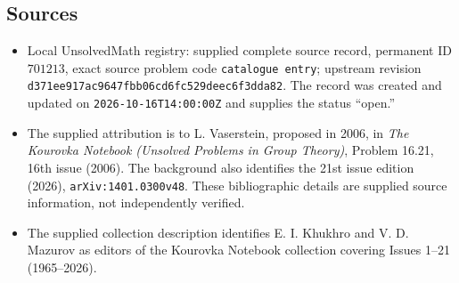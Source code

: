 \documentclass[11pt]{article}
\begin{document}
\subsection{Sources}
\begin{itemize}
\item Local UnsolvedMath registry: supplied complete source record, permanent ID \(701213\), exact source problem code \texttt{catalogue entry}; upstream revision \texttt{d371ee917ac9647fbb06cd6fc529deec6f3dda82}. The record was created and updated on \texttt{2026-10-16T14:00:00Z} and supplies the status ``open.''
\item The supplied attribution is to L. Vaserstein, proposed in 2006, in \emph{The Kourovka Notebook (Unsolved Problems in Group Theory)}, Problem 16.21, 16th issue (2006). The background also identifies the 21st issue edition (2026), \texttt{arXiv:1401.0300v48}. These bibliographic details are supplied source information, not independently verified.
\item The supplied collection description identifies E. I. Khukhro and V. D. Mazurov as editors of the Kourovka Notebook collection covering Issues 1--21 (1965--2026).
\end{itemize}
\end{document}
